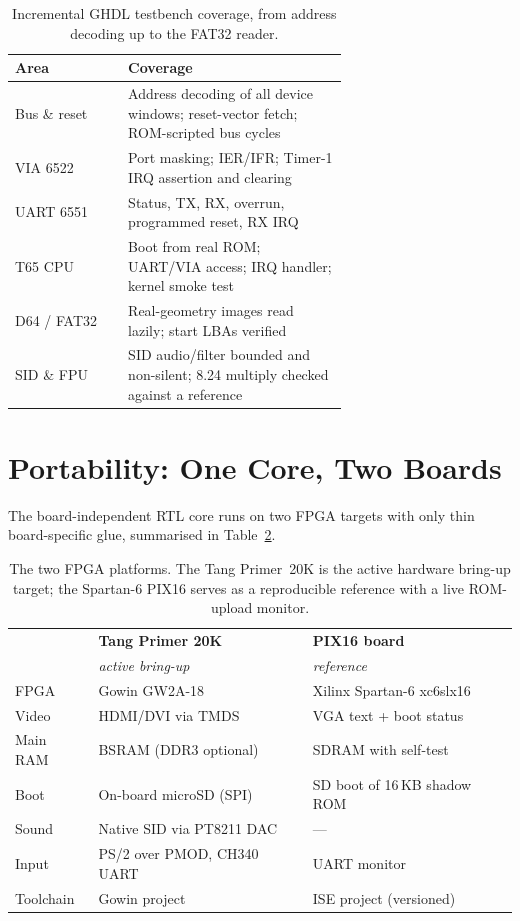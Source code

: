 \documentclass[11pt,a4paper]{article}
\begin{document}
\begin{table}[h]
\centering
\small
\begin{tabular}{@{}l p{0.66\linewidth}@{}}
\toprule
\textbf{Area} & \textbf{Coverage} \\
\midrule
Bus \& reset & Address decoding of all device windows; reset-vector fetch; ROM-scripted bus cycles \\
VIA 6522     & Port masking; IER/IFR; Timer-1 IRQ assertion and clearing \\
UART 6551    & Status, TX, RX, overrun, programmed reset, RX IRQ \\
T65 CPU      & Boot from real ROM; UART/VIA access; IRQ handler; kernel smoke test \\
D64 / FAT32  & Real-geometry images read lazily; start LBAs verified \\
SID \& FPU   & SID audio/filter bounded and non-silent; 8.24 multiply checked against a reference \\
\bottomrule
\end{tabular}
\caption{Incremental GHDL testbench coverage, from address decoding up to
the FAT32 reader.}
\label{tab:tests}
\end{table}

\section{Portability: One Core, Two Boards}

The board-independent RTL core runs on two FPGA targets with only thin
board-specific glue, summarised in Table~\ref{tab:boards}.

\begin{table}[h]
\centering
\small
\begin{tabular}{@{}l l l@{}}
\toprule
& \textbf{Tang Primer 20K} & \textbf{PIX16 board} \\
& \textit{active bring-up} & \textit{reference} \\
\midrule
FPGA      & Gowin GW2A-18 & Xilinx Spartan-6 xc6slx16 \\
Video     & HDMI/DVI via TMDS & VGA text + boot status \\
Main RAM  & BSRAM (DDR3 optional) & SDRAM with self-test \\
Boot      & On-board microSD (SPI) & SD boot of 16\,KB shadow ROM \\
Sound     & Native SID via PT8211 DAC & --- \\
Input     & PS/2 over PMOD, CH340 UART & UART monitor \\
Toolchain & Gowin project & ISE project (versioned) \\
\bottomrule
\end{tabular}
\caption{The two FPGA platforms. The Tang Primer~20K is the active
hardware bring-up target; the Spartan-6 PIX16 serves as a reproducible
reference with a live ROM-upload monitor.}
\label{tab:boards}
\end{table}
\end{document}
